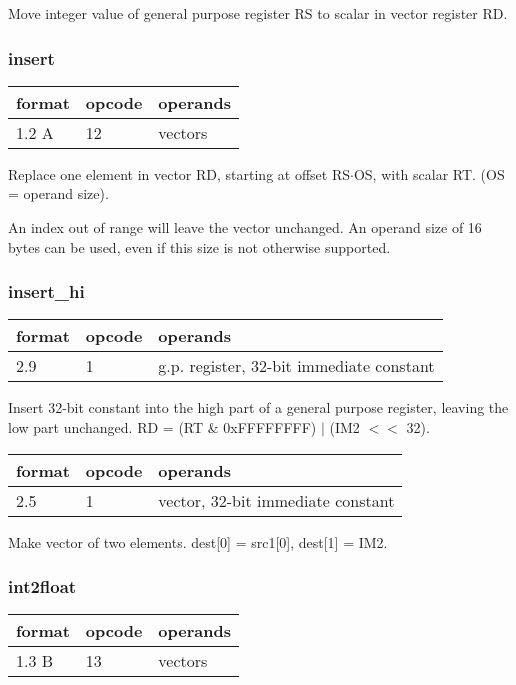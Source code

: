 \documentclass[forwardcom.tex]{subfiles}
\begin{document}
Move integer value of general purpose register RS to
scalar in vector register RD.

\subsubsection{insert}
\label{table:insertInstruction}
\begin{tabular}{|p{12mm}|p{12mm}|p{110mm}|}
\hline
\bfseries format & \bfseries opcode & \bfseries operands \\ \hline
1.2 A & 12 & vectors \\ \hline
\end{tabular}
\vspace{2mm}

Replace one element in vector RD, starting at
offset RS$\cdot$OS, with scalar RT. (OS = operand size).
\vspace{2mm}

An index out of range will leave the vector unchanged. An operand size of 16 bytes can be used, even if this size is not otherwise supported.

\subsubsection{insert\_hi}
\label{table:insertHiInstruction}
\begin{tabular}{|p{12mm}|p{12mm}|p{110mm}|}
\hline
\bfseries format & \bfseries opcode & \bfseries operands \\ \hline
2.9 & 1 & g.p. register, 32-bit immediate constant \\ \hline
\end{tabular}
\vspace{2mm}

Insert 32-bit constant into the high part of a
general purpose register, leaving the low part
unchanged. RD = (RT \& 0xFFFFFFFF) $|$ (IM2 $<<$ 32).
\vspace{2mm}

\begin{tabular}{|p{12mm}|p{12mm}|p{110mm}|}
\hline
\bfseries format & \bfseries opcode & \bfseries operands \\ \hline
2.5 & 1 & vector, 32-bit immediate constant  \\ \hline
\end{tabular}
\vspace{2mm}

Make vector of two elements. dest[0] =
src1[0], dest[1] = IM2.


\subsubsection{int2float}
\label{table:int2floatInstruction}
\begin{tabular}{|p{12mm}|p{12mm}|p{110mm}|}
\hline
\bfseries format & \bfseries opcode & \bfseries operands \\ \hline
1.3 B & 13 & vectors \\ \hline
\end{tabular}
\vspace{2mm}
\end{document}
